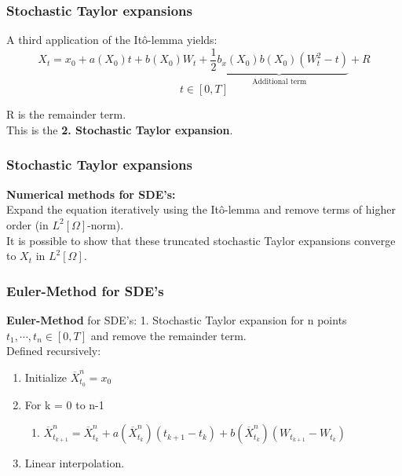 \begin{frame}
\frametitle{Stochastic Taylor expansions}
A third application of the It\^o-lemma yields:
\[X_t = x_0 + a(X_0)t + b(X_0)W_t +  \underbrace{\frac{1}{2}b_x(X_0)b(X_0)(W_t^2-t)}_{\text{Additional term}} +  R\]
\[t\in [0,T]\]

R is the remainder term.\\
This is the \textbf{2. Stochastic Taylor expansion}.
\end{frame}

\begin{frame}
\frametitle{Stochastic Taylor expansions}
\textbf{Numerical methods for SDE's:}\\ 
Expand the equation iteratively using the It\^o-lemma and remove terms of higher order (in \(L^2[\Omega]\)-norm).\\

It is possible to show that these truncated stochastic Taylor expansions converge to \(X_t\) in \(L^2[\Omega]\).

\end{frame}

\begin{frame}
\frametitle{Euler-Method for SDE's}
\textbf{Euler-Method} for SDE's: 1. Stochastic Taylor expansion for n points \(t_1,\cdots,t_n\in[0,T]\) and remove the remainder term.\\
Defined recursively:\\
\begin{enumerate}
\item Initialize \(\overline{X}^n_{t_0}=x_0\)
\item For k = 0 to n-1
\begin{enumerate}
\item \(\overline{X}^n_{t_{k+1}} = \overline{X}^n_{t_k} + a(\overline{X}^n_{t_k})(t_{k+1}-t_k) + b(\overline{X}^n_{t_k})(W_{t_{k+1}}-W_{t_k})\)
\end{enumerate}
\item Linear interpolation.
\end{enumerate}
\end{frame}


